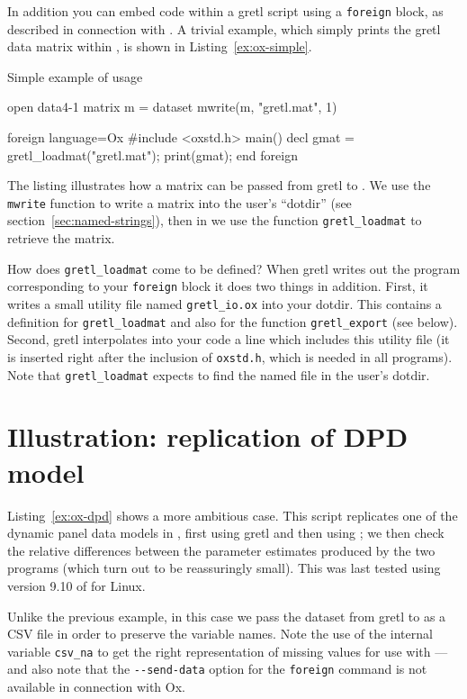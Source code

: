 In addition you can embed  code within a gretl script
using a \texttt{foreign} block, as described in connection with
.  A trivial example, which simply prints the gretl data
matrix within , is shown in Listing~\ref{ex:ox-simple}.

\begin{script}
  \caption{Simple example of  usage}
  \label{ex:ox-simple}
\begin{scode}
open data4-1
matrix m = {dataset}
mwrite(m, "gretl.mat", 1)

foreign language=Ox 
#include <oxstd.h>
main()
{
   decl gmat = gretl_loadmat("gretl.mat");
   print(gmat);
}
end foreign
\end{scode}
\end{script}

The listing illustrates how a matrix can be passed from gretl to
.  We use the \texttt{mwrite} function to write a matrix into
the user's ``dotdir'' (see section~\ref{sec:named-strings}), then in
 we use the function \verb|gretl_loadmat| to retrieve the
matrix.

How does \verb|gretl_loadmat| come to be defined?  When gretl
writes out the  program corresponding to your \texttt{foreign}
block it does two things in addition.  First, it writes a small
utility file named \verb|gretl_io.ox| into your dotdir.  This contains
a definition for \verb|gretl_loadmat| and also for the function
\verb|gretl_export| (see below).  Second, gretl interpolates
into your  code a line which includes this utility file (it is
inserted right after the inclusion of \texttt{oxstd.h}, which is
needed in all  programs).  Note that \verb|gretl_loadmat|
expects to find the named file in the user's dotdir.

\section{Illustration: replication of DPD model}
\label{sec:dpd-replication}

Listing~\ref{ex:ox-dpd} shows a more ambitious case.  This script
replicates one of the dynamic panel data models in
\cite{arellano-bond91}, first using gretl and then using ; we
then check the relative differences between the parameter estimates
produced by the two programs (which turn out to be reassuringly
small). This was last tested using version 9.10 of 
for Linux.

Unlike the previous example, in this case we pass the dataset from
gretl to  as a CSV file in order to preserve the
variable names.  Note the use of the internal variable \verb|csv_na|
to get the right representation of missing values for use with
---and also note that the \verb|--send-data| option for the
\texttt{foreign} command is not available in connection with Ox.

